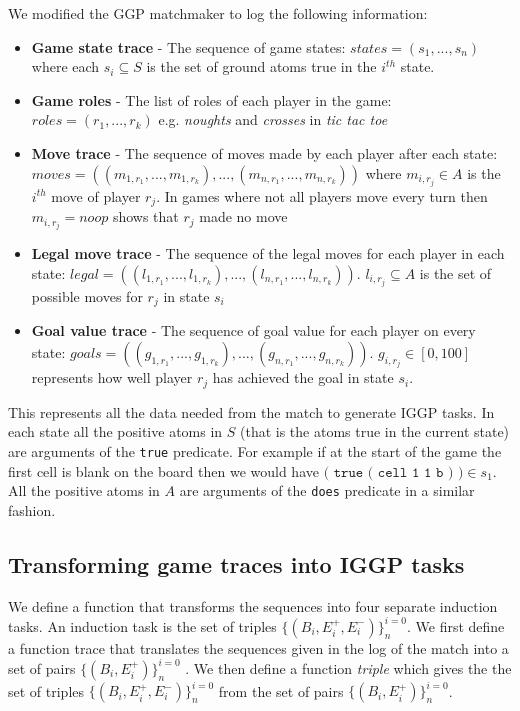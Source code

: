 We modified the GGP matchmaker to log the following information:
\begin{itemize}
	\item \textbf{Game state trace} - The sequence of game states: $states = (s_1,...,s_n)$ where each $s_i \subseteq S$ is the set of ground atoms true in the $i^{th}$ state.
	\item \textbf{Game roles} - The list of roles of each player in the game: $roles = (r_1,...,r_k)$ e.g. \textit{noughts} and \textit{crosses} in \textit{tic tac toe}
	\item \textbf{Move trace} - The sequence of moves made by each player after each state: $moves = ((m_{1,r_1},...,m_{1,r_k}),...,(m_{n,r_1},...,m_{n,r_k}))$ where $m_{i,r_j} \in A$ is the $i^{th}$ move of player $r_j$. In games where not all players move every turn then $m_{i,r_j}=noop$ shows that $r_j$ made no move
	\item \textbf{Legal move trace} - The sequence of the legal moves for each player in each state:  $legal = ((l_{1,r_1},...,l_{1,r_k}),...,(l_{n,r_1},...,l_{n,r_k}))$. $l_{i,r_j} \subseteq A$ is the set of possible moves for $r_j$ in state $s_i$
	\item \textbf{Goal value trace} - The sequence of goal value for each player on every state: $goals = ((g_{1,r_1},...,g_{1,r_k}),...,(g_{n,r_1},...,g_{n,r_k}))$. $g_{i,r_j} \in [0,100]$ represents how well player $r_j$ has achieved the goal in state $s_i$.

\end{itemize}
This represents all the data needed from the match to generate IGGP tasks. In each state all the positive atoms in $S$ (that is the atoms true in the current state) are arguments of the \texttt{true} predicate. For example if at the start of the game the first cell is blank on the board then we would have $\texttt{( true ( cell 1 1 b ) )} \in s_1$. All the positive atoms in $A$ are arguments of the \texttt{does} predicate in a similar fashion.

\subsection{Transforming game traces into IGGP tasks}

We define a function that transforms the sequences into four separate induction tasks. An induction task is the set of triples $\{(B_i,E_i^+,E_i^-)\}_n^{i=0}$. We first define a function trace that translates the sequences given in the log of the match into a set of pairs $\{(B_i,E_i^+)\}_n^{i=0}$ . We then define a function \textit{triple} which gives the the set of triples  $\{(B_i,E_i^+,E_i^-)\}_n^{i=0}$ from the set of pairs $\{(B_i,E_i^+)\}_n^{i=0}$.
\\

